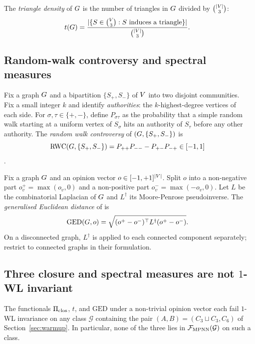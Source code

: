 \begin{definition}\label{def:triangles}
The \emph{triangle density} of $G$ is the number of triangles in
$G$ divided by $\binom{|V|}{3}$:
\[
t(G) = \frac{|\{S \in \binom{V}{3} : S \text{ induces a
triangle}\}|}{\binom{|V|}{3}}.
\]
\end{definition}

\subsection{Random-walk controversy and spectral measures}

\begin{definition}\label{def:rwc}
Fix a graph $G$ and a bipartition $\{S_+, S_-\}$ of $V$
into two disjoint communities. Fix a small integer $k$ and identify
\emph{authorities}: the $k$-highest-degree vertices of each side.
For $\sigma, \tau \in \{+, -\}$, define $P_{\sigma\tau}$ as the
probability that a simple random walk starting at a uniform vertex
of $S_\sigma$ hits an authority of $S_\tau$ before any other
authority. The \emph{random walk controversy} of $(G, \{S_+,
S_-\})$ is
\[
\mathrm{RWC}(G, \{S_+, S_-\}) = P_{++} P_{--} - P_{+-} P_{-+}
\in [-1, 1]
\]
\citep{Garimella18}.
\end{definition}

\begin{definition}\label{def:ged}
Fix a graph $G$ and an opinion vector $o \in [-1, +1]^{|V|}$.
Split $o$ into a non-negative part $o^+_v = \max(o_v, 0)$ and a
non-positive part $o^-_v = \max(-o_v, 0)$. Let $L$ be the
combinatorial Laplacian of $G$ and $L^\dagger$ its Moore-Penrose
pseudoinverse. The \emph{generalised Euclidean distance} of
\citet{HohmannGED2023} is
\[
\mathrm{GED}(G, o) = \sqrt{(o^+ - o^-)^\top L^\dagger (o^+ - o^-)}.
\]
On a disconnected graph, $L^\dagger$ is applied to each connected
component separately; \citet{HohmannGED2023} restrict to connected
graphs in their formulation.
\end{definition}

\subsection{Three closure and spectral measures are not $1$-WL invariant}

\begin{proposition}\label{prop:noncomputable-measures}
The functionals $\Pi_{\mathrm{clos}}$, $t$, and $\mathrm{GED}$ under a
non-trivial opinion vector each fail $1$-WL invariance on any class
$\mathcal{G}$ containing the pair $(A, B) = (C_3 \sqcup C_3, C_6)$
of Section~\ref{sec:warmup}. In particular, none of the three lies in
$\mathcal{F}_{\mathrm{MPNN}}(\mathcal{G})$ on such a class.
\end{proposition}


